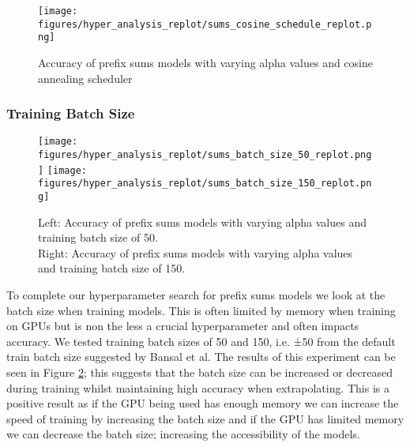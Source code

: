 \begin{figure}[h]
\centering
    \texttt{[image: figures/hyper\_analysis\_replot/sums\_cosine\_schedule\_replot.png]}
    \caption{
    Accuracy of prefix sums models with varying alpha values and cosine annealing scheduler}
    \label{figs:cosine}
\end{figure}
\subsubsection{Training Batch Size}

\begin{figure}[h]
    \texttt{[image: figures/hyper\_analysis\_replot/sums\_batch\_size\_50\_replot.png]}\hfill
    \texttt{[image: figures/hyper\_analysis\_replot/sums\_batch\_size\_150\_replot.png]}
    \caption{
    Left: Accuracy of prefix sums models with varying alpha values and training batch size of 50. \\
    Right: Accuracy of prefix sums models with varying alpha values and training batch size of 150.}
    \label{figs:sumstrainbatch}
\end{figure}
To complete our hyperparameter search for prefix sums models we look at the batch size when training models. This is often limited by memory when training on GPUs but is non the less a crucial hyperparameter and often impacts accuracy. We tested training batch sizes of 50 and 150, i.e. ±50 from the default train batch size suggested by Bansal et al. The results of this experiment can be seen in Figure \ref{figs:sumstrainbatch}; this suggests that the batch size can be increased or decreased during training whilst maintaining high accuracy when extrapolating. This is a positive result as if the GPU being used has enough memory we can increase the speed of training by increasing the batch size and if the GPU has limited memory we can decrease the batch size; increasing the accessibility of the models.


